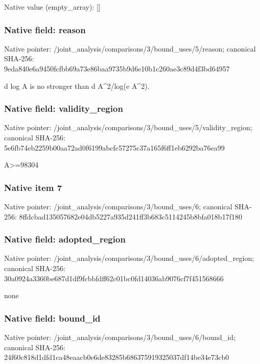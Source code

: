 \documentclass[10pt,a4paper]{article}
\begin{document}
Native value (empty\_\allowbreak{}array): []

\subsubsection{Native field: reason}
Native pointer: /joint\_\allowbreak{}analysis/comparisons/3/bound\_\allowbreak{}uses/5/reason; canonical SHA-256: 9eda840e6a9450fcfbb69a73e86baa9735b9d6e10b1c260ae3c89d4f3bd64957

\begingroup\raggedright\sloppy d log A is no stronger than d A\textasciicircum{}2/\allowbreak{}log(e A\textasciicircum{}2).\par\endgroup

\subsubsection{Native field: validity\_\allowbreak{}region}
Native pointer: /joint\_\allowbreak{}analysis/comparisons/3/bound\_\allowbreak{}uses/5/validity\_\allowbreak{}region; canonical SHA-256: 5e6fb74eb2259b00aa72ad0f6199abcfc57275c37a165f6ff1eb6292ba76ea99

\begingroup\raggedright\sloppy A>=\allowbreak{}98304\par\endgroup

\subsubsection{Native item 7}
Native pointer: /joint\_\allowbreak{}analysis/comparisons/3/bound\_\allowbreak{}uses/6; canonical SHA-256: 8ffdcbad135057682e04db5227a935d241ff3b683c5114245b8bfa018b17f180

\subsubsection{Native field: adopted\_\allowbreak{}region}
Native pointer: /joint\_\allowbreak{}analysis/comparisons/3/bound\_\allowbreak{}uses/6/adopted\_\allowbreak{}region; canonical SHA-256: 30a0924a3360be687d1df9fcbbfdff62c01bc0fd14036ab9076cf7f451568666

\begingroup\raggedright\sloppy none\par\endgroup

\subsubsection{Native field: bound\_\allowbreak{}id}
Native pointer: /joint\_\allowbreak{}analysis/comparisons/3/bound\_\allowbreak{}uses/6/bound\_\allowbreak{}id; canonical SHA-256: 24f60c818d1dfd1ca48eaacb0e6de83285b686375919325037df14be34e73cb0
\end{document}
